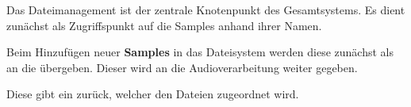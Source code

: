 Das Dateimanagement ist der zentrale Knotenpunkt des Gesamtsystems. Es dient zunächst als Zugriffspunkt auf die Samples anhand ihrer Namen. 

Beim Hinzufügen neuer \textbf{Samples} in das Dateisystem werden diese zunächst als  an die  übergeben. Dieser wird an die Audioverarbeitung weiter gegeben. 
 
Diese gibt ein  zurück, welcher den Dateien zugeordnet wird.

